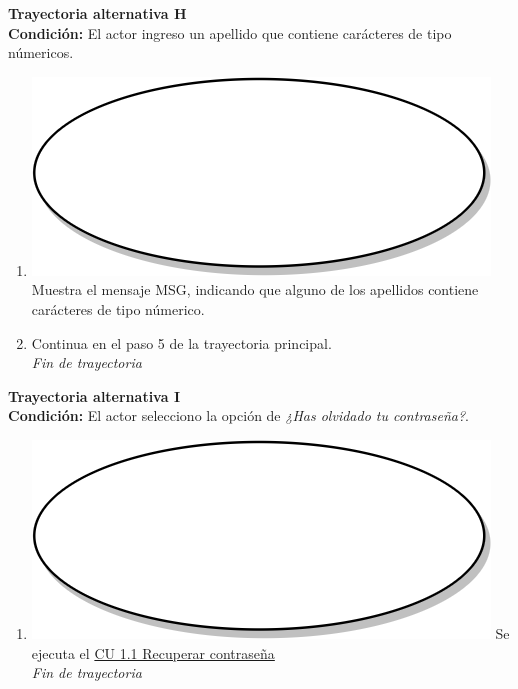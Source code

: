 \textbf{Trayectoria alternativa H} \label{cu2_ta_h}\\
\textbf{Condición:} El actor ingreso un apellido que contiene carácteres de tipo númericos.\\
 \begin{enumerate}[label=H\arabic*]
    \item {\includegraphics[scale=.05]{Capitulo3/img/proceso.png} Muestra el mensaje MSG, indicando que alguno de los apellidos contiene carácteres de tipo númerico.}
    \item {Continua en el paso 5 de la trayectoria principal.} \\
    \textit{Fin de trayectoria} \\
\end{enumerate}

\textbf{Trayectoria alternativa I} \label{cu2_ta_i}\\
\textbf{Condición:} El actor selecciono la opción de \textit{¿Has olvidado tu contraseña?}.\\
 \begin{enumerate}[label=I\arabic*]
    \item {\includegraphics[scale=.05]{Capitulo3/img/proceso.png} Se ejecuta el \hyperref[cu1_1]{CU 1.1 Recuperar contraseña}} \\
    \textit{Fin de trayectoria} \\
\end{enumerate}

